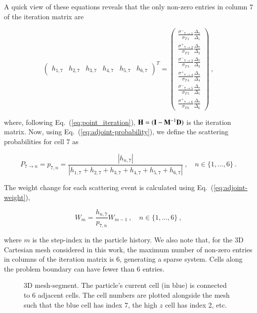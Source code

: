 \documentclass[preprint,12pt]{elsarticle}
\newcommand{\vI}{\ensuremath{\ve{I}}}
\newcommand{\sigm}{\ensuremath{\sigma^{-}}}
\newcommand{\sigp}{\ensuremath{\sigma^{+}}}
\begin{document}
A quick view of these equations reveals that the only non-zero entries
in column 7 of the iteration matrix are

\begin{equation*}
  \begin{pmatrix}
    h_{1,7} &
    h_{2,7} &
    h_{3,7} &
    h_{4,7} &
    h_{5,7} &
    h_{6,7} 
  \end{pmatrix}^{T}
  = 
  \begin{pmatrix}
    \frac{\sigm_{7\rightarrow 1}}{\sigma_{T\,1}}\frac{\Delta_7}{\Delta_1} \\
    \frac{\sigp_{7\rightarrow 2}}{\sigma_{T\,2}}\frac{\Delta_7}{\Delta_2} \\
    \frac{\sigm_{7\rightarrow 3}}{\sigma_{T\,3}}\frac{\Delta_7}{\Delta_3} \\
    \frac{\sigp_{7\rightarrow 4}}{\sigma_{T\,4}}\frac{\Delta_7}{\Delta_4} \\
    \frac{\sigm_{7\rightarrow 5}}{\sigma_{T\,5}}\frac{\Delta_7}{\Delta_5} \\
    \frac{\sigp_{7\rightarrow 6}}{\sigma_{T\,6}}\frac{\Delta_7}{\Delta_6}
  \end{pmatrix}\:,
\end{equation*}

where, following Eq.~(\ref{eq:point_iteration}), $\ve{H} = (\vI -
\ve{M}^{-1}\ve{D})$ is the iteration matrix.  Now, using
Eq.~(\ref{eq:adjoint-probability}), we define the scattering
probabilities for cell 7 as

\begin{equation*}
  P_{7\rightarrow n} = p_{7,n} = \frac{|h_{n,7}|}{|h_{1,7} + 
    h_{2,7} + h_{3,7} + h_{4,7} + h_{5,7} + h_{6,7}|}\:,\quad
  n\in \{1,\ldots,6\}\:.
\end{equation*}

The weight change for each scattering event is calculated using
Eq.~(\ref{eq:adjoint-weight}),

\begin{equation*}
  W_{m} = \frac{h_{n,7}}{p_{7,n}}W_{m-1}\:,\quad
  n\in \{1,\ldots,6\}\:,
\end{equation*}

where $m$ is the step-index in the particle history.  We also note
that, for the 3D Cartesian mesh considered in this work, the maximum
number of non-zero entries in columns of the iteration matrix is 6,
generating a sparse system.  Cells along the problem boundary can have
fewer than 6 entries.

\begin{figure}[htpb!]
  \centerline{
    }
  \caption{3D mesh-segment.  The particle's current cell (in blue) is
    connected to 6 adjacent cells.  The cell numbers are plotted
    alongside the mesh such that the blue cell has index 7, the high
    $z$ cell has index 2, etc.}
  \label{fig:mesh_segment}
\end{figure}
\end{document}
